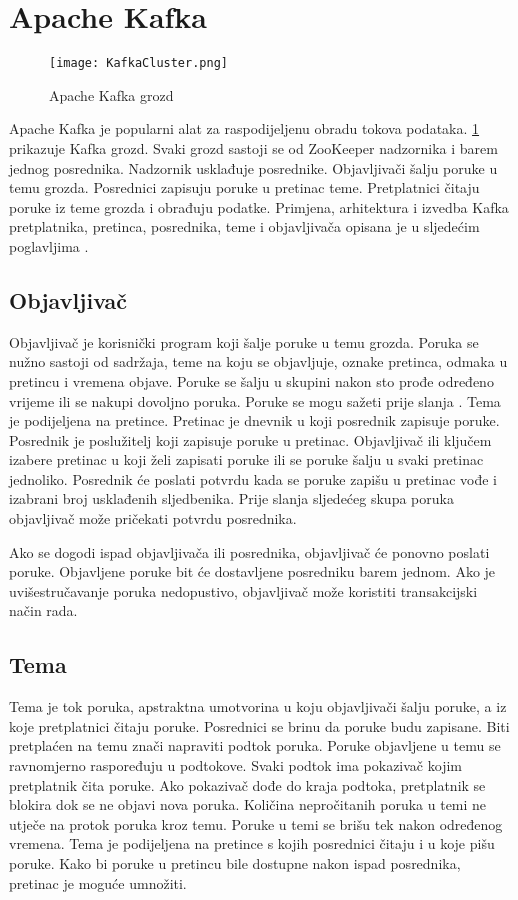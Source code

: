 \documentclass[utf8, diplomski, lmodern, numeric]{fer}
\begin{document}
\section{Apache Kafka}

\begin{figure}[H]
    \centering
    \texttt{[image: KafkaCluster.png]}
    \caption{Apache Kafka grozd}
    \label{fig:kafka-cluster}
\end{figure}

Apache Kafka je popularni alat za raspodijeljenu obradu tokova podataka. \ref{fig:kafka-cluster} prikazuje Kafka grozd. Svaki grozd sastoji se od ZooKeeper nadzornika i barem jednog posrednika. Nadzornik usklađuje posrednike. Objavljivači šalju poruke u temu grozda. Posrednici zapisuju poruke u pretinac teme. Pretplatnici čitaju poruke iz teme grozda i obrađuju podatke. Primjena, arhitektura i izvedba Kafka pretplatnika, pretinca, posrednika, teme i objavljivača opisana je u sljedećim poglavljima \citep{kafka-whitepaper} \citep{kafka-docs}.

\subsection{Objavljivač}
Objavljivač je korisnički program koji šalje poruke u temu grozda. Poruka se nužno sastoji od sadržaja, teme na koju se objavljuje, oznake pretinca, odmaka u pretincu i vremena objave. Poruke se šalju u skupini nakon sto prođe određeno vrijeme ili se nakupi dovoljno poruka. Poruke se mogu sažeti prije slanja \citep{kafka-compression}. Tema je podijeljena na pretince. Pretinac je dnevnik u koji posrednik zapisuje poruke. Posrednik je poslužitelj koji zapisuje poruke u pretinac. Objavljivač ili ključem izabere pretinac u koji želi zapisati poruke ili se poruke šalju u svaki pretinac jednoliko. Posrednik će poslati potvrdu kada se poruke zapišu u pretinac vođe i izabrani broj usklađenih sljedbenika. Prije slanja sljedećeg skupa poruka objavljivač može pričekati potvrdu posrednika.

Ako se dogodi ispad objavljivača ili posrednika, objavljivač će ponovno poslati poruke. Objavljene poruke bit će dostavljene posredniku barem jednom. Ako je uvišestručavanje poruka nedopustivo, objavljivač može koristiti transakcijski način rada.

\subsection{Tema}
Tema je tok poruka, apstraktna umotvorina u koju objavljivači šalju poruke, a iz koje pretplatnici čitaju poruke. Posrednici se brinu da poruke budu zapisane. Biti pretplaćen na temu znači napraviti podtok poruka. Poruke objavljene u temu se ravnomjerno raspoređuju u podtokove. Svaki podtok ima pokazivač kojim pretplatnik čita poruke. Ako pokazivač dođe do kraja podtoka, pretplatnik se blokira dok se ne objavi nova poruka. Količina nepročitanih poruka u temi ne utječe na protok poruka kroz temu. Poruke u temi se brišu tek nakon određenog vremena. Tema je podijeljena na pretince s kojih posrednici čitaju i u koje pišu poruke. Kako bi poruke u pretincu bile dostupne nakon ispad posrednika, pretinac je moguće umnožiti.
\end{document}
